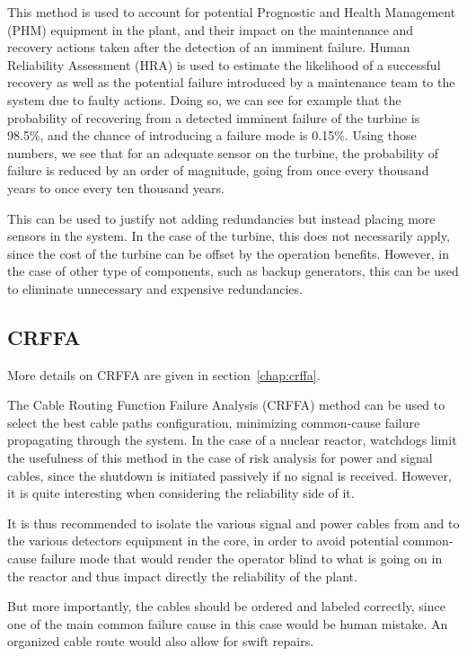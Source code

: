 This method is used to account for potential Prognostic and Health Management (PHM) equipment in the plant, and their impact on the maintenance and recovery actions taken after the detection of an imminent failure. Human Reliability Assessment (HRA) is used to estimate the likelihood of a successful recovery as well as the potential failure introduced by a maintenance team to the system due to faulty actions. Doing so, we can see for example that the probability of recovering from a detected imminent failure of the turbine is 98.5\%, and the chance of introducing a failure mode is 0.15\%. Using those numbers, we see that for an adequate sensor on the turbine, the probability of failure is reduced by an order of magnitude, going from once every thousand years to once every ten thousand years.

This can be used to justify not adding redundancies but instead placing more sensors in the system. In the case of the turbine, this does not necessarily apply, since the cost of the turbine can be offset by the operation benefits. However, in the case of other type of components, such as backup generators, this can be used to eliminate unnecessary and expensive redundancies.

\subsection{CRFFA}

More details on CRFFA are given in section~\ref{chap:crffa}.

The Cable Routing Function Failure Analysis (CRFFA) method can be used to select the best cable paths configuration, minimizing common-cause failure propagating through the system. In the case of a nuclear reactor, watchdogs limit the usefulness of this method in the case of risk analysis for power and signal cables, since the shutdown is initiated passively if no signal is received. However, it is quite interesting when considering the reliability side of it.

It is thus recommended to isolate the various signal and power cables from and to the various detectors equipment in the core, in order to avoid potential common-cause failure mode that would render the operator blind to what is going on in the reactor and thus impact directly the reliability of the plant.

But more importantly, the cables should be ordered and labeled correctly, since one of the main common failure cause in this case would be human mistake. An organized cable route would also allow for swift repairs.
